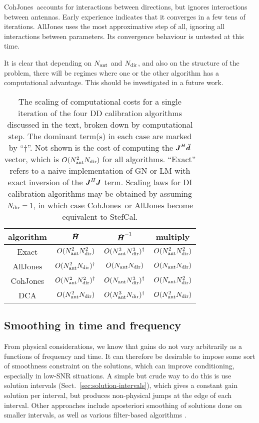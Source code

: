\documentclass[useAMS,usenatbib]{mn2e}
\newcommand{\mat}[1]{{\bmath{#1}}}
\newcommand{\JJ}{\mat{J}} %
\newcommand{\HHa}{\mat{\tilde{H}}} %
\newcommand{\JHJ}{\JJ^H\JJ} %
\newcommand{\AUG}[1]{\bmath{\breve{#1}}}
\newcommand{\Dd}{\AUG{d}}
\newcommand{\COH}{{\sc CohJones}}
\newcommand{\StefCal}{{\sc StefCal}}
\begin{document}
\COH\ accounts for interactions between directions, but ignores interactions between antennas. Early experience 
indicates that it converges in a few tens of iterations. {\sc AllJones} uses the most approximative step of all,
ignoring all interactions between parameters. Its convergence behaviour is untested at this time.

It is clear that depending on $N_\mathrm{ant}$ and $N_\mathrm{dir}$, and also on the structure of the problem, there will be 
regimes where one or the other algorithm has a computational advantage. This should be investigated in a future work.


\begin{table}
\begin{tabular}{c|ccc}
algorithm & $\HHa$ & $\HHa^{-1}$ & multiply \\
\hline
Exact          & $O(N_\mathrm{ant}^2N_\mathrm{dir}^2)$ & $O(N_\mathrm{ant}^3N_\mathrm{dir}^3)^\dagger$ &  $O(N_\mathrm{ant}^2N_\mathrm{dir}^2)$ \\ 
{\sc AllJones} & $O(N_\mathrm{ant}^2N_\mathrm{dir})^\dagger$   & $O(N_\mathrm{ant}N_\mathrm{dir})$     &  $O(N_\mathrm{ant}N_\mathrm{dir})$ \\
\COH           & $O(N_\mathrm{ant}^2N_\mathrm{dir}^2)^\dagger$ & $O(N_\mathrm{ant}N_\mathrm{dir}^3)^\dagger$   &  $O(N_\mathrm{ant}N_\mathrm{dir}^2)$ \\
DCA            & $O(N_\mathrm{ant}^2N_\mathrm{dir})$   & $O(N_\mathrm{ant}^3N_\mathrm{dir})^\dagger$   &  $O(N_\mathrm{ant}^2N_\mathrm{dir})$ \\
\hline
\end{tabular}
\caption{\label{tab:costs}The scaling of computational costs for a single iteration of the 
four DD calibration algorithms discussed in the text, broken down by computational step. 
The dominant term(s) in each case are marked by ``$\dagger$''. Not shown is the cost of computing the $\JJ^H\Dd$ 
vector, which is $O(N_\mathrm{ant}^2N_\mathrm{dir})$ for all algorithms. ``Exact'' refers to a naive implementation of GN or LM with exact 
inversion of the $\JHJ$ term. Scaling laws for DI calibration algorithms may be obtained by assuming $N_\mathrm{dir}=1$, in which
case \COH\ or {\sc AllJones} become equivalent to \StefCal. 
}
\end{table}

\subsection{Smoothing in time and frequency}
\label{sec:DI:smooth}

From physical considerations, we know that gains do not vary arbitrarily as a functions of frequency and time. It can
therefore be desirable to impose some sort of smoothness constraint on the solutions, which can improve conditioning, especially
in low-SNR situations. A simple but crude way to do this is use solution intervals (Sect.~\ref{sec:solution-intervals}),
which gives a constant gain solution per interval, but produces non-physical jumps at the edge of each interval.
Other approaches include aposteriori smoothing of solutions done on smaller intervals, as well as various filter-based 
algorithms \citep{tasse-filters}. 
\end{document}
